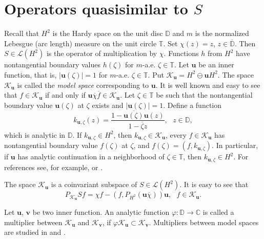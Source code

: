 \documentclass[a4paper,oneside,11pt]{amsart}
\numberwithin{equation}{section}
\theoremstyle{plain}
\theoremstyle{definition}
\begin{document}
\section{Operators quasisimilar to $S$}

Recall that $H^2$ is the Hardy space on the unit disc $\mathbb D$ and 
$m$ is the normalized Lebesgue (arc length) measure  on the unit circle $\mathbb T$. 
Set $\chi(z)=z$, $z\in\overline{\mathbb D}$. Then $S\in \mathcal L(H^2)$ is the operator of multiplication by $\chi$. 
Functions $h$ from $H^2$ have nontangential boundary values $h(\zeta)$ for  $m$-a.e. $\zeta \in\mathbb T$. 
Let ${\mathbf u}$ be an inner function, that is, $|{\mathbf u}(\zeta)|=1$ for  $m$-a.e. $\zeta \in\mathbb T$. 
Put $\mathcal K_{\mathbf u}=H^2\ominus{\mathbf u} H^2$. The space $\mathcal K_{\mathbf u}$ is called the 
\emph{model space} 
corresponding to ${\mathbf u}$. It is well known and easy to see that $f\in\mathcal K_{\mathbf u}$ if and only if 
${\mathbf u}\overline\chi\overline f\in\mathcal K_{\mathbf u}$. Let  $\zeta\in\mathbb T$ be such that 
 the nontangential boundary value ${\mathbf u}(\zeta)$ at  $\zeta$ exists and  $|{\mathbf u}(\zeta)|=1$. Define a function  
\begin{equation}
\label{y1}
k_{{\mathbf u},\zeta}(z)=\frac{1-\overline{{\mathbf u}(\zeta)}{\mathbf u}(z)}{1-\overline\zeta z},\ \ \ z\in\mathbb D,  
\end{equation}
which is  analytic in $\mathbb D$. If $k_{{\mathbf u},\zeta}\in H^2$, then 
$k_{{\mathbf u},\zeta}\in\mathcal K_{\mathbf u}$, every $f\in\mathcal K_{\mathbf u}$ has nontangential boundary value $f(\zeta)$ at $\zeta$, and $f(\zeta)=(f,k_{{\mathbf u},\zeta})$. In particular, if $\mathbf u$ has analytic continuation 
in a neighborhood of $\zeta\in\mathbb T$, then $k_{{\mathbf u},\zeta}\in H^2$.  For references see, for example, 
{\cite[Theorem 8.6.1]{cauchy}} or {\cite[Theorem 6.11]{model}}.  

The space $\mathcal K_{\mathbf u}$ is a coinvariant subspace of $S\in\mathcal L(H^2)$. 
 It is easy to see that  
\begin{equation}
\label{y2}
P_{\mathcal K_{\mathbf u}}S f =\chi f-(f,P_{H^2}({\mathbf u}\overline\chi)){\mathbf u}, \ \ \ f\in\mathcal K_{\mathbf u}. 
\end{equation}

Let $\mathbf u$, $\mathbf v$ be two inner function.  An analytic  function $\varphi\colon\mathbb D\to\mathbb C$ is called a   multiplier between $\mathcal K_{\mathbf u}$ and $\mathcal K_{\mathbf v}$, if 
$\varphi\mathcal K_{\mathbf u}\subset\mathcal K_{\mathbf v}$. Multipliers between model spaces are studied in  \cite{c} and  \cite{fhr}. 
\end{document}
